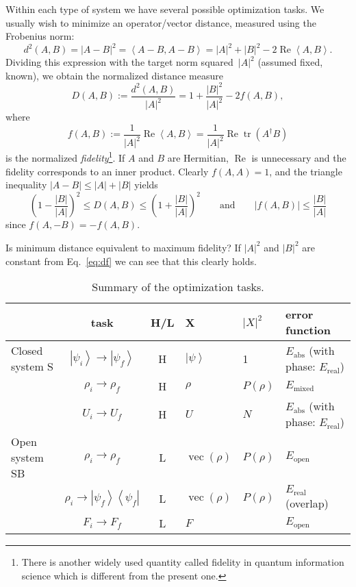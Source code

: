 \documentclass[aps, pra, a4paper, longbibliography]{revtex4}
\newcommand{\be}{\begin{equation}}
\newcommand{\ee}{\end{equation}}
\newcommand{\ket}[1]{\left| #1 \right \rangle}
\newcommand{\ketbra}[2]{\left| #1 \right \rangle \left \langle #2 \right|}
\newcommand{\inprod}[2]{\left\langle #1, #2 \right\rangle}
\DeclareMathOperator{\tr}{tr}
\DeclareMathOperator{\re}{Re}
\DeclareMathOperator{\cvec}{vec}
\begin{document}
Within each type of system we have several possible optimization
tasks.
We usually wish to minimize an operator/vector distance, measured using the Frobenius norm:
\be
d^2(A, B) = |A-B|^2
= \inprod{A-B}{A-B}
= |A|^2 +|B|^2 -2 \re \inprod{A}{B}.
\ee
Dividing this expression with the target norm squared~$|A|^2$ (assumed fixed,
known), we obtain the normalized distance measure
\be
\label{eq:df}
D(A,B)
:= \frac{d^2(A, B)}{|A|^2}
= 1 +\frac{|B|^2}{|A|^2} -2 f(A, B),
\ee
where
\be
f(A, B)
:= \frac{1}{|A|^2} \re \inprod{A}{B}
= \frac{1}{|A|^2} \re \tr(A^\dagger B)
\ee
is the normalized \emph{fidelity}\footnote{
There is another widely used quantity called fidelity in quantum information science which is different from the present one.}.
If $A$ and $B$ are Hermitian, $\re$ is unnecessary and the fidelity corresponds to an inner product.
Clearly $f(A, A) = 1$, and
the triangle inequality $|A-B| \le |A|+|B|$ yields
\be
\left(1 -\frac{|B|}{|A|} \right)^2 \le D(A, B) \le \left(1 +\frac{|B|}{|A|} \right)^2
\qquad \text{and} \qquad
|f(A, B)|
\le \frac{|B|}{|A|}
\ee
since $f(A, -B) = -f(A, B)$.


Is minimum distance equivalent to maximum fidelity?
If $|A|^2$ and $|B|^2$ are constant
from Eq.~\eqref{eq:df} we can see that this clearly holds.






\begin{table}
\begin{tabular}{l|c|c|l|l|l}
& task & H/L & X & $|X|^2$ & error function\\
\hline
Closed system S
& $\ket{\psi_i} \to \ket{\psi_f}$ & H & $\ket{\psi}$ & 1 &
$E_\text{abs}$ (with phase: $E_\text{real}$)\\
& $\rho_i \to \rho_f$ & H & $\rho$ & $P(\rho)$ & $E_\text{mixed}$\\
& $U_i \to U_f$ & H & $U$ & $N$ & $E_\text{abs}$ (with phase: $E_\text{real}$)\\
\hline
Open system SB
& $\rho_i \to \rho_f$ & L & $\cvec(\rho)$ & $P(\rho)$ & $E_\text{open}$\\
& $\rho_i \to \ketbra{\psi_f}{\psi_f}$ & L & $\cvec(\rho)$ &
$P(\rho)$ & $E_\text{real}$ (overlap)\\
& $F_i \to F_f$ & L & $F$ &  & $E_\text{open}$\\
\end{tabular}
\caption{Summary of the optimization tasks.}
\label{table:tasks}
\end{table}
\end{document}
